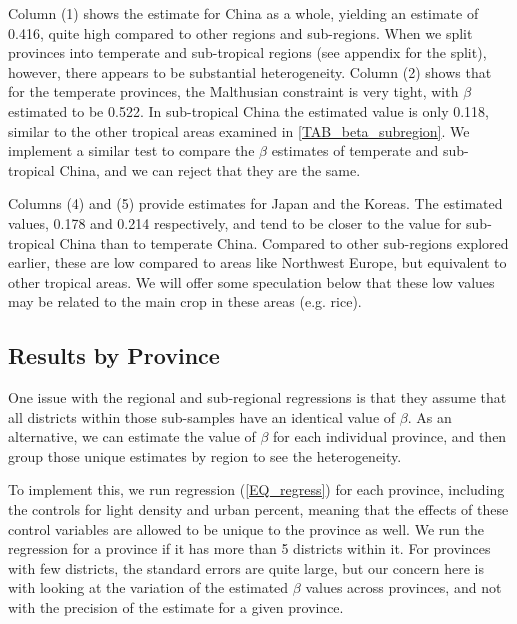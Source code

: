 \documentclass[11pt]{article}
\begin{document}
Column (1) shows the estimate for China as a whole, yielding an estimate of 0.416, quite high compared to other regions and sub-regions. When we split provinces into temperate and sub-tropical regions (see appendix for the split), however, there appears to be substantial heterogeneity. Column (2) shows that for the temperate provinces, the Malthusian constraint is very tight, with $\beta$ estimated to be 0.522. In sub-tropical China the estimated value is only 0.118, similar to the other tropical areas examined in \ref{TAB_beta_subregion}. We implement a similar test to compare the $\beta$ estimates of temperate and sub-tropical China, and we can reject that they are the same.

Columns (4) and (5) provide estimates for Japan and the Koreas. The estimated values, 0.178 and 0.214 respectively, and tend to be closer to the value for sub-tropical China than to temperate China. Compared to other sub-regions explored earlier, these are low compared to areas like Northwest Europe, but equivalent to other tropical areas. We will offer some speculation below that these low values may be related to the main crop in these areas (e.g. rice).

\subsection{Results by Province}
One issue with the regional and sub-regional regressions is that they assume that all districts within those sub-samples have an identical value of $\beta$. As an alternative, we can estimate the value of $\beta$ for each individual province, and then group those unique estimates by region to see the heterogeneity. 

To implement this, we run regression (\ref{EQ_regress}) for each province, including the controls for light density and urban percent, meaning that the effects of these control variables are allowed to be unique to the province as well. We run the regression for a province if it has more than 5 districts within it. For provinces with few districts, the standard errors are quite large, but our concern here is with looking at the variation of the estimated $\beta$ values across provinces, and not with the precision of the estimate for a given province.
\end{document}

